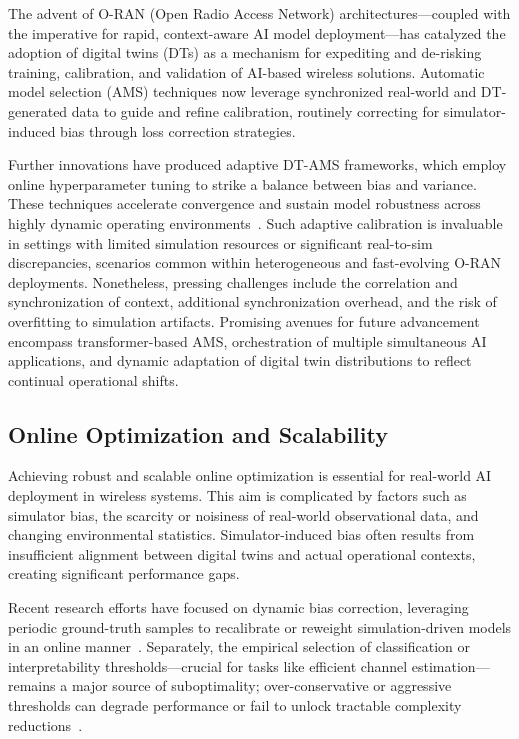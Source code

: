 The advent of O-RAN (Open Radio Access Network) architectures—coupled with the imperative for rapid, context-aware AI model deployment—has catalyzed the adoption of digital twins (DTs) as a mechanism for expediting and de-risking training, calibration, and validation of AI-based wireless solutions. Automatic model selection (AMS) techniques now leverage synchronized real-world and DT-generated data to guide and refine calibration, routinely correcting for simulator-induced bias through loss correction strategies.

Further innovations have produced adaptive DT-AMS frameworks, which employ online hyperparameter tuning to strike a balance between bias and variance. These techniques accelerate convergence and sustain model robustness across highly dynamic operating environments~\cite{ref37}. Such adaptive calibration is invaluable in settings with limited simulation resources or significant real-to-sim discrepancies, scenarios common within heterogeneous and fast-evolving O-RAN deployments. Nonetheless, pressing challenges include the correlation and synchronization of context, additional synchronization overhead, and the risk of overfitting to simulation artifacts. Promising avenues for future advancement encompass transformer-based AMS, orchestration of multiple simultaneous AI applications, and dynamic adaptation of digital twin distributions to reflect continual operational shifts.

\subsection{Online Optimization and Scalability}

Achieving robust and scalable online optimization is essential for real-world AI deployment in wireless systems. This aim is complicated by factors such as simulator bias, the scarcity or noisiness of real-world observational data, and changing environmental statistics. Simulator-induced bias often results from insufficient alignment between digital twins and actual operational contexts, creating significant performance gaps.

Recent research efforts have focused on dynamic bias correction, leveraging periodic ground-truth samples to recalibrate or reweight simulation-driven models in an online manner~\cite{ref37,ref38}. Separately, the empirical selection of classification or interpretability thresholds—crucial for tasks like efficient channel estimation—remains a major source of suboptimality; over-conservative or aggressive thresholds can degrade performance or fail to unlock tractable complexity reductions~\cite{ref41}.

